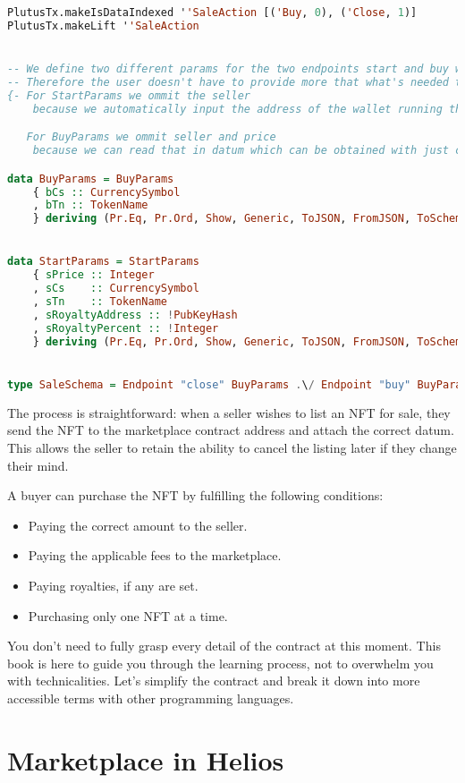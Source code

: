 \begin{lstlisting}[language=haskell, caption=Types Code for Marketplace Contract]
PlutusTx.makeIsDataIndexed ''SaleAction [('Buy, 0), ('Close, 1)]
PlutusTx.makeLift ''SaleAction


-- We define two different params for the two endpoints start and buy with the minimal info needed.
-- Therefore the user doesn't have to provide more that what's needed to execute the said action.
{- For StartParams we ommit the seller
    because we automatically input the address of the wallet running the startSale enpoint

   For BuyParams we ommit seller and price
    because we can read that in datum which can be obtained with just cs and tn of the sold token -}

data BuyParams = BuyParams
    { bCs :: CurrencySymbol
    , bTn :: TokenName
    } deriving (Pr.Eq, Pr.Ord, Show, Generic, ToJSON, FromJSON, ToSchema)


data StartParams = StartParams
    { sPrice :: Integer
    , sCs    :: CurrencySymbol
    , sTn    :: TokenName
    , sRoyaltyAddress :: !PubKeyHash
    , sRoyaltyPercent :: !Integer
    } deriving (Pr.Eq, Pr.Ord, Show, Generic, ToJSON, FromJSON, ToSchema)


type SaleSchema = Endpoint "close" BuyParams .\/ Endpoint "buy" BuyParams .\/ Endpoint "start" StartParams
\end{lstlisting}
The process is straightforward: when a seller wishes to list an NFT for sale, they send the NFT to the marketplace contract address and attach the correct datum. This allows the seller to retain the ability to cancel the listing later if they change their mind.

A buyer can purchase the NFT by fulfilling the following conditions: 
\begin{itemize}
    \item Paying the correct amount to the seller.
    \item Paying the applicable fees to the marketplace.
    \item Paying royalties, if any are set.
    \item Purchasing only one NFT at a time.
\end{itemize}

You don't need to fully grasp every detail of the contract at this moment. This book is here to guide you through the learning process, not to overwhelm you with technicalities. Let's simplify the contract and break it down into more accessible terms with other programming languages.

\section{Marketplace in Helios}

